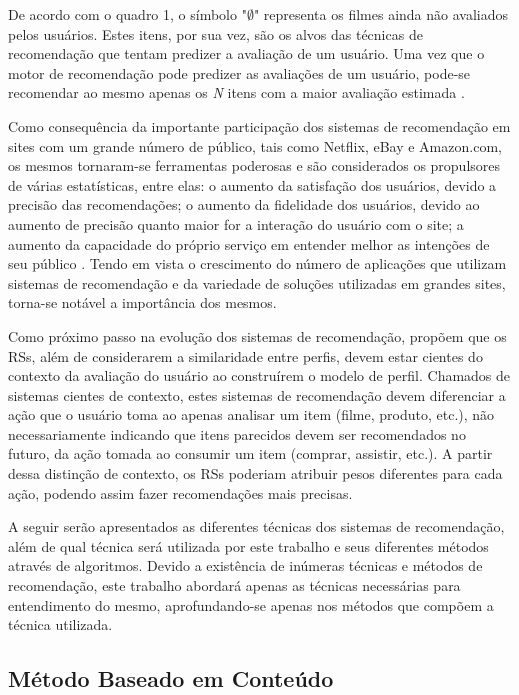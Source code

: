 \documentclass[12pt, openright, oneside, a4paper, brazil]{abntex2}
\begin{document}
De acordo com o quadro 1, o símbolo "$\emptyset$" representa os filmes ainda não avaliados pelos usuários. Estes itens, por sua vez, são os alvos das técnicas de recomendação que tentam predizer a avaliação de um usuário. Uma vez que o motor de recomendação pode predizer as avaliações de um usuário, pode-se recomendar ao mesmo apenas os \emph{N} itens com a maior avaliação estimada \cite{adomavicius2005toward}.

Como consequência da importante participação dos sistemas de recomendação em sites com um grande número de público, tais como Netflix, eBay e Amazon.com, os mesmos tornaram-se ferramentas poderosas \cite{schafer1999recommender} e são considerados os propulsores de várias estatísticas, entre elas: o aumento da satisfação dos usuários, devido a precisão das recomendações; o aumento da fidelidade dos usuários, devido ao aumento de precisão quanto maior for a interação do usuário com o site; a aumento da capacidade do próprio serviço em entender melhor as intenções de seu público \cite{ricci2011introduction}. Tendo em vista o crescimento do número de aplicações que utilizam sistemas de recomendação e da variedade de soluções utilizadas em grandes sites, torna-se notável a importância dos mesmos.

Como próximo passo na evolução dos sistemas de recomendação,  propõem que os RSs, além de considerarem a similaridade entre perfis, devem estar cientes do contexto da avaliação do usuário ao construírem o modelo de perfil. Chamados de sistemas cientes de contexto, estes sistemas de recomendação devem diferenciar a ação que o usuário toma ao apenas analisar um item (filme, produto, etc.), não necessariamente indicando que itens parecidos devem ser recomendados no futuro, da ação tomada ao consumir um item (comprar, assistir, etc.). A partir dessa distinção de contexto, os RSs poderiam atribuir pesos diferentes para cada ação, podendo assim fazer recomendações mais precisas.

A seguir serão apresentados as diferentes técnicas dos sistemas de recomendação, além de qual técnica será utilizada por este trabalho e seus diferentes métodos através de algoritmos. Devido a existência de inúmeras técnicas e métodos de recomendação, este trabalho abordará apenas as técnicas necessárias para entendimento do mesmo, aprofundando-se apenas nos métodos que compõem a técnica utilizada.

\subsection{Método Baseado em Conteúdo}
\end{document}
